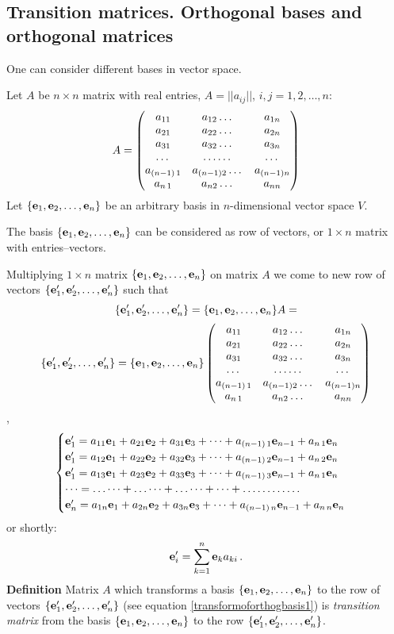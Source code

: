 \documentclass[12pt]{article}
\numberwithin{equation}{section}
\begin{document}

\subsection {Transition matrices. Orthogonal bases and orthogonal matrices}

One can consider different  bases in vector space.

Let $A$ be $n\times n$ matrix with real entries, $A=||a_{ij}||$, $i,j=1,2,\dots,n$:
             $$
          A=\begin{pmatrix}
   a_{11} &a_{12}\dots &a_{1n}\cr
   a_{21} &a_{22}\dots &a_{2n}\cr
 a_{31} &a_{32}\dots &a_{3n}\cr
 \dots &\dots\dots &\dots\cr
 a_{(n-1)\, 1} &a_{(n-1) 2}\dots &a_{(n-1)n}\cr
 a_{n\,1} &a_{n 2}\dots &a_{n n}\cr
\end{pmatrix}
                $$
Let $\{{\bf e}_1,{\bf e}_2,\dots,{\bf e}_n\}$ be an arbitrary  basis in $n$-dimensional vector space $V$.


The basis $\{{\bf e}_1,{\bf e}_2,\dots,{\bf e}_n\}$ can be considered as row of vectors,
or $1\times n$ matrix with entries--vectors.


Multiplying  $1\times n$ matrix $\{{\bf e}_1,{\bf e}_2,\dots,{\bf e}_n\}$ on matrix $A$ we come to new row of vectors
$\{{\bf e}'_1,{\bf e}'_2,\dots,{\bf e}'_n\}$ such that
 \begin{equation}\label{transformoforthogbasis0}
  \{{\bf e}'_1,{\bf e}'_2,\dots,{\bf e}'_n\}=\{{\bf e}_1,{\bf e}_2,\dots,{\bf e}_n\}A=
 \end{equation}
    \begin{equation}\label{transformoforthogbasis}
\{{\bf e}'_1,{\bf e}'_2,\dots,{\bf e}'_n\}=\{{\bf e}_1,{\bf e}_2,\dots,{\bf e}_n\}
\begin{pmatrix}
   a_{11} &a_{12}\dots &a_{1n}\cr
   a_{21} &a_{22}\dots &a_{2n}\cr
 a_{31} &a_{32}\dots &a_{3n}\cr
 \dots &\dots\dots &\dots\cr
 a_{(n-1)\, 1} &a_{(n-1) 2}\dots &a_{(n-1)n}\cr
 a_{n\,1} &a_{n 2}\dots &a_{n n}\cr
\end{pmatrix}
\end{equation},
            $$
        \begin{cases}
        {\bf e}'_1=a_{11}{\bf e}_1+a_{21}{\bf e}_2+a_{31}{\bf e}_3+\dots+a_{(n-1)\, 1}{\bf e}_{n-1}+a_{n\, 1}{\bf e}_n\cr
        {\bf e}'_1=a_{12}{\bf e}_1+a_{22}{\bf e}_2+a_{32}{\bf e}_3+\dots+a_{(n-1)\, 2}{\bf e}_{n-1}+a_{n\, 2}{\bf e}_n\cr
        {\bf e}'_1=a_{13}{\bf e}_1+a_{23}{\bf e}_2+a_{33}{\bf e}_3+\dots+a_{(n-1)\, 3}{\bf e}_{n-1}+a_{n\, 1}{\bf e}_n\cr
        \dots=\dots\dots+\dots\dots+\dots\dots+\dots+\dots\dots \dots\dots\cr
        {\bf e}'_n=a_{1n}{\bf e}_1+a_{2n}{\bf e}_2+a_{3n}{\bf e}_3+\dots+a_{(n-1)\, n}{\bf e}_{n-1}+a_{n\, n}{\bf e}_n\cr
        \end{cases}
          $$
         or shortly:
        \begin{equation}\label{transformoforthogbasis1}
               {\bf e}_i'=\sum_{k=1}^n {\bf e}_k a_{ki}\,.
         \end{equation}
 {\bf Definition } Matrix $A$ which transforms a 
  basis $\{{\bf e}_1,{\bf e}_2,\dots,{\bf e}_n\}$
  to the row of vectors  $\{{\bf e}'_1,{\bf e}'_2,\dots,{\bf e}'_n\}$ 
(see equation \eqref{transformoforthogbasis1})
  is  {\it transition matrix} from the basis 
$\{{\bf e}_1,{\bf e}_2,\dots,{\bf e}_n\}$ to the row
  $\{{\bf e}'_1,{\bf e}'_2,\dots,{\bf e}'_n\}$.
\end{document}
